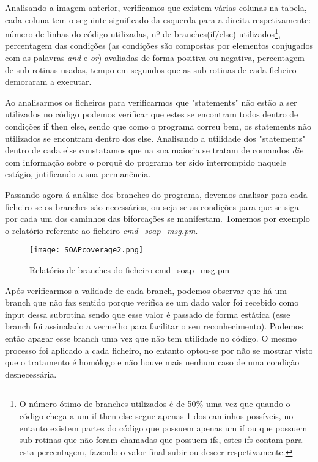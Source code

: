 \par Analisando a imagem anterior, verificamos que existem várias colunas na tabela, cada coluna tem o seguinte significado da esquerda para a direita respetivamente: número de linhas do código utilizadas, nº de branches(if/else) utilizados\footnote{O número ótimo de branches utilizados é de 50\% uma vez que quando o código chega a um if then else segue apenas 1 dos caminhos possíveis, no entanto existem partes do código que possuem apenas um if ou que possuem sub-rotinas que não foram chamadas que possuem ifs, estes ifs contam para esta percentagem, fazendo o valor final subir ou descer respetivamente.}, percentagem das condições (as condições são compostas por elementos conjugados com as palavras \textit{and} e \textit{or}) avaliadas de forma positiva ou negativa, percentagem de sub-rotinas usadas, tempo em segundos que as sub-rotinas de cada ficheiro demoraram a executar.
\par Ao analisarmos os ficheiros para verificarmos que "statements" não estão a ser utilizados no código podemos verificar que estes se encontram todos dentro de condições if then else, sendo que como o programa correu bem, os statements não utilizados se encontram dentro dos else. Analisando a utilidade dos "statements" dentro de cada else constatamos que na sua maioria se tratam de comandos \textit{die} com informação sobre o porquê do programa ter sido interrompido naquele estágio, jutificando a sua permanência.


\par Passando agora á análise dos branches do programa, devemos analisar para cada ficheiro se os branches são necessários, ou seja se as condições para que se siga por cada um dos caminhos das biforcações se manifestam. Tomemos por exemplo o relatório referente ao ficheiro \textit{cmd\_soap\_msg.pm}.

\begin{figure}[H]

  \centering
  \captionsetup{justification=centering}

  \texttt{[image: SOAPcoverage2.png]}
  
  \caption {Relatório de branches do ficheiro cmd\_soap\_msg.pm}

\end{figure}

\par Após verificarmos a validade de cada branch, podemos observar que há um branch que não faz sentido porque verifica se um dado valor foi recebido como input dessa subrotina sendo que esse valor é passado de forma estática (esse branch foi assinalado a vermelho para facilitar o seu reconhecimento). Podemos então apagar esse branch uma vez que não tem utilidade no código. O mesmo processo foi aplicado a cada ficheiro, no entanto optou-se por não se mostrar visto que o tratamento é homólogo e não houve mais nenhum caso de uma condição desnecessária.

